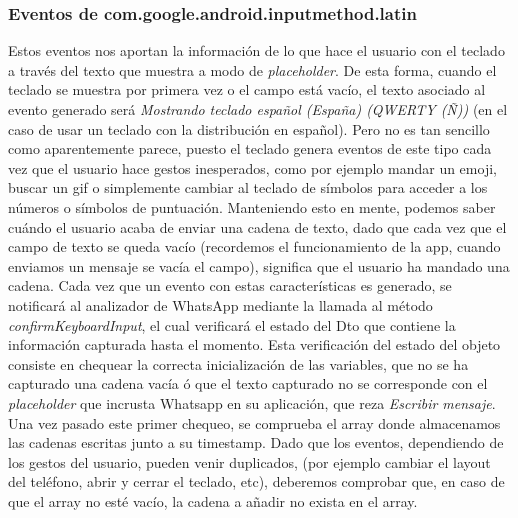 \documentclass[12pt,a4paper,oneside]{book} %
\begin{document}
\subsubsection{Eventos de com.google.android.inputmethod.latin}
Estos eventos nos aportan la información de lo que hace el usuario con el teclado a través del texto que muestra a modo de \textit{placeholder}. De esta forma, cuando el teclado se muestra por primera vez o el campo está vacío, el texto asociado al evento generado será \textit{Mostrando teclado español (España) (QWERTY (Ñ))} (en el caso de usar un teclado con la distribución en español). 
\newline \newline 
Pero no es tan sencillo como aparentemente parece, puesto el teclado genera eventos de este tipo cada vez que el usuario hace gestos inesperados, como por ejemplo mandar un emoji, buscar un gif o simplemente cambiar al teclado de símbolos para acceder a los números o símbolos de puntuación. 
\newline \newline 
Manteniendo esto en mente, podemos saber cuándo el usuario acaba de enviar una cadena de texto, dado que cada vez que el campo de texto se queda vacío (recordemos el funcionamiento de la app, cuando enviamos un mensaje se vacía el campo), significa que el usuario ha mandado una cadena. Cada vez que un evento con estas características es generado, se notificará al analizador de WhatsApp mediante la llamada al método \textit{confirmKeyboardInput}, el cual verificará el estado del Dto que contiene la información capturada hasta el momento. 
\newline \newline 
Esta verificación del estado del objeto consiste en chequear la correcta inicialización de las variables, que no se ha capturado una cadena vacía ó que el texto capturado no se corresponde con el \textit{placeholder} que incrusta Whatsapp en su aplicación, que reza \textit{Escribir mensaje}. 
\newline \newline
Una vez pasado este primer chequeo, se comprueba el array donde almacenamos las cadenas escritas junto a su timestamp. Dado que los eventos, dependiendo de los gestos del usuario, pueden venir duplicados, (por ejemplo cambiar el layout del teléfono, abrir y cerrar el teclado, etc), deberemos comprobar que, en caso de que el array no esté vacío, la cadena a añadir no exista en el array. 
\newline \newline 
\end{document}
